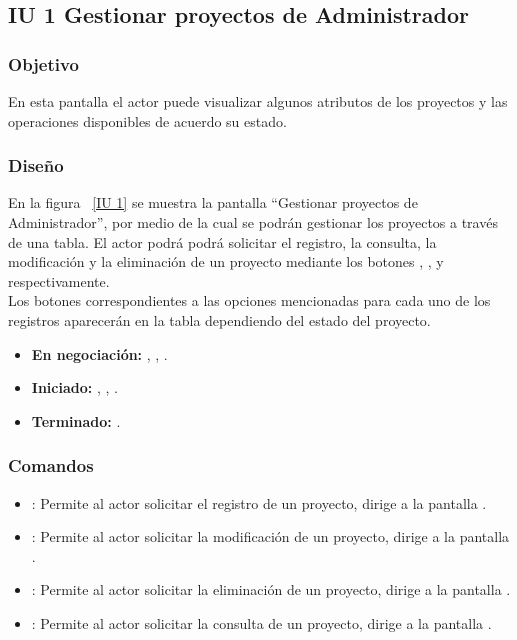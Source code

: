 \subsection{IU 1 Gestionar proyectos de Administrador}
\subsubsection{Objetivo}
	
	En esta pantalla el actor puede visualizar algunos atributos de los proyectos y las operaciones disponibles de acuerdo su estado.

\subsubsection{Diseño}

    En la figura ~\ref{IU 1} se muestra la pantalla ``Gestionar proyectos de Administrador'', por medio de la cual 
    se podrán gestionar los proyectos a través de una tabla. El actor podrá podrá solicitar el registro, la consulta, la modificación y la eliminación 
    de un proyecto mediante los botones
    , \btnConsulta, \btnEditar y \btnEliminar respectivamente. \\
    
    Los botones correspondientes a las opciones mencionadas para cada uno de los registros aparecerán en la tabla dependiendo del estado
    del proyecto.
    	
    \begin{itemize}
	    \item {\bf En negociación:} \btnConsulta, \btnEditar, \btnEliminar.
	    \item {\bf Iniciado:} \btnConsulta, \btnEditar, \btnEliminar.
            \item {\bf Terminado:} \btnConsulta.
    \end{itemize}



\subsubsection{Comandos}
\begin{itemize}
	\item {}: Permite al actor solicitar el registro de un proyecto, dirige a la pantalla .
	\item \btnEditar[Modificar]: Permite al actor solicitar la modificación de un proyecto, dirige a la pantalla .
	\item \btnEliminar[Eliminar]: Permite al actor solicitar la eliminación de un proyecto, dirige a la pantalla .
	\item \btnConsulta[Consultar]: Permite al actor solicitar la consulta de un proyecto, dirige a la pantalla .
\end{itemize}
